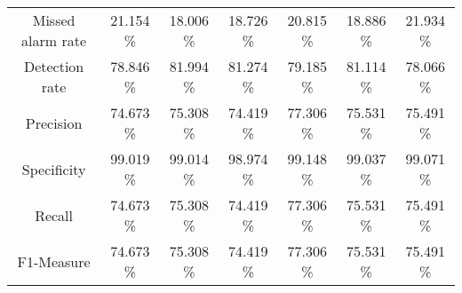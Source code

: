 \begin{table}[htb]
\begin{tabular}{@{}ccccccc@{}}
        Missed alarm rate &  21.154 \% &  18.006 \% &  18.726 \% &  20.815 \% &  18.886 \% &  21.934 \% \\
        Detection rate &  78.846 \% &  81.994 \% &  81.274 \% &  79.185 \% &  81.114 \% &  78.066 \% \\
        Precision &  74.673 \% &  75.308 \% &  74.419 \% &  77.306 \% &  75.531 \% &  75.491 \% \\
        Specificity &  99.019 \% &  99.014 \% &  98.974 \% &  99.148 \% &  99.037 \% &  99.071 \% \\
        Recall &  74.673 \% &  75.308 \% &  74.419 \% &  77.306 \% &  75.531 \% &  75.491 \% \\
        F1-Measure &  74.673 \% &  75.308 \% &  74.419 \% &  77.306 \% &  75.531 \% &  75.491 \% \\
        \bottomrule
    \end{tabular}
\end{table}